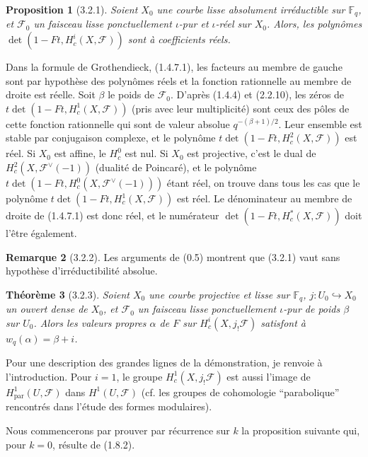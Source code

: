 \documentclass[12pt,a4paper]{article}
\theoremstyle{plain}
\newtheorem{theorem}{Th\'eor\`eme}[section]
\newtheorem{proposition}[theorem]{Proposition}
\theoremstyle{definition}
\newtheorem{remark}[theorem]{Remarque}
\theoremstyle{remark}
\newcommand{\FF}{{\mathbb{F}}}
\begin{document}
\begin{proposition}[3.2.1]
Soient $X_0$ une courbe lisse absolument irr\'eductible sur $\FF_q$, et $\mathscr{F}_0$ un faisceau lisse ponctuellement $\iota$-pur et $\iota$-r\'eel sur $X_0$. Alors, les polyn\^omes $\det(1 - Ft, H_c^i(X, \mathscr{F}))$ sont \`a coefficients r\'eels.
\end{proposition}

Dans la formule de Grothendieck, (1.4.7.1), les facteurs au membre de gauche sont par hypoth\`ese des polyn\^omes r\'eels et la fonction rationnelle au membre de droite est r\'eelle. Soit $\beta$ le poids de $\mathscr{F}_0$. D'apr\`es (1.4.4) et (2.2.10), les z\'eros de $t \det(1 - Ft, H_c^1(X, \mathscr{F}))$ (pris avec leur multiplicit\'e) sont ceux des p\^oles de cette fonction rationnelle qui sont de valeur absolue $q^{-(\beta+1)/2}$. Leur ensemble est stable par conjugaison complexe, et le polyn\^ome $t \det(1 - Ft, H_c^2(X, \mathscr{F}))$ est r\'eel. Si $X_0$ est affine, le $H_c^0$ est nul. Si $X_0$ est projective, c'est le dual de $H_c^2(X, \mathscr{F}^\vee(-1))$ (dualit\'e de Poincar\'e), et le polyn\^ome $t \det(1 - Ft, H_c^0(X, \mathscr{F}^\vee(-1)))$ \'etant r\'eel, on trouve dans tous les cas que le polyn\^ome $t \det(1 - Ft, H_c^1(X, \mathscr{F}))$ est r\'eel. Le d\'enominateur au membre de droite de (1.4.7.1) est donc r\'eel, et le num\'erateur $\det(1 - Ft, H_c^*(X, \mathscr{F}))$ doit l'\^etre \'egalement.

\begin{remark}[3.2.2]
Les arguments de (0.5) montrent que (3.2.1) vaut sans hypoth\`ese d'irr\'eductibilit\'e absolue.
\end{remark}

\begin{theorem}[3.2.3]
Soient $X_0$ une courbe projective et lisse sur $\FF_q$, $j : U_0 \hookrightarrow X_0$ un ouvert dense de $X_0$, et $\mathscr{F}_0$ un faisceau lisse ponctuellement $\iota$-pur de poids $\beta$ sur $U_0$. Alors les valeurs propres $\alpha$ de $F$ sur $H_c^i(X, j_!\mathscr{F})$ satisfont \`a $w_q(\alpha) = \beta + i$.
\end{theorem}

Pour une description des grandes lignes de la d\'emonstration, je renvoie \`a l'introduction. Pour $i = 1$, le groupe $H_c^1(X, j_!\mathscr{F})$ est aussi l'image de $H_{\text{par}}^1(U, \mathscr{F})$ dans $H^1(U, \mathscr{F})$ (cf. les groupes de cohomologie ``parabolique'' rencontr\'es dans l'\'etude des formes modulaires).

Nous commencerons par prouver par r\'ecurrence sur $k$ la proposition suivante qui, pour $k = 0$, r\'esulte de (1.8.2).
\end{document}
